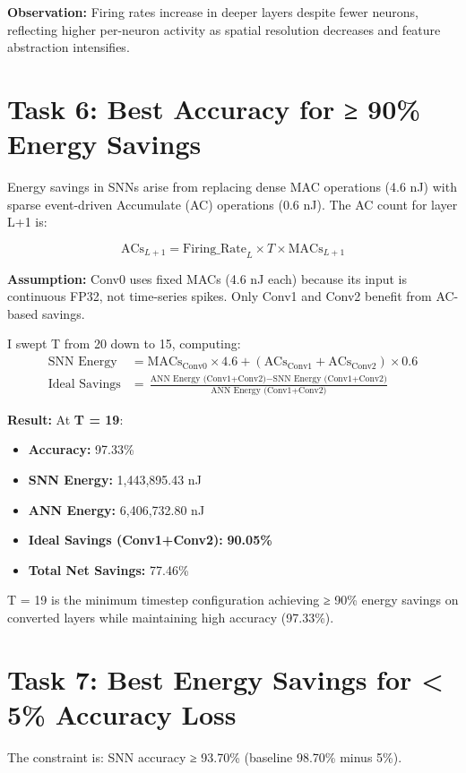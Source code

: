 \documentclass[11pt, a4paper]{article}
\begin{document}
\textbf{Observation:} Firing rates increase in deeper layers despite fewer neurons, reflecting higher per-neuron activity as spatial resolution decreases and feature abstraction intensifies.

\section{Task 6: Best Accuracy for ≥ 90\% Energy Savings}

Energy savings in SNNs arise from replacing dense MAC operations (4.6 nJ) with sparse event-driven Accumulate (AC) operations (0.6 nJ). The AC count for layer L+1 is:

\[
\text{ACs}_{L+1} = \text{Firing\_Rate}_L \times T \times \text{MACs}_{L+1}
\]

\textbf{Assumption:} Conv0 uses fixed MACs (4.6 nJ each) because its input is continuous FP32, not time-series spikes. Only Conv1 and Conv2 benefit from AC-based savings.

I swept T from 20 down to 15, computing:
\begin{align*}
\text{SNN Energy} &= \text{MACs}_{\text{Conv0}} \times 4.6 + (\text{ACs}_{\text{Conv1}} + \text{ACs}_{\text{Conv2}}) \times 0.6 \\
\text{Ideal Savings} &= \frac{\text{ANN Energy (Conv1+Conv2)} - \text{SNN Energy (Conv1+Conv2)}}{\text{ANN Energy (Conv1+Conv2)}}
\end{align*}

\textbf{Result:} At \textbf{T = 19}:
\begin{itemize}
    \item \textbf{Accuracy:} 97.33\%
    \item \textbf{SNN Energy:} 1,443,895.43 nJ
    \item \textbf{ANN Energy:} 6,406,732.80 nJ
    \item \textbf{Ideal Savings (Conv1+Conv2):} \textbf{90.05\%}
    \item \textbf{Total Net Savings:} 77.46\%
\end{itemize}

T = 19 is the minimum timestep configuration achieving ≥ 90\% energy savings on converted layers while maintaining high accuracy (97.33\%).

\section{Task 7: Best Energy Savings for < 5\% Accuracy Loss}

The constraint is: SNN accuracy ≥ 93.70\% (baseline 98.70\% minus 5\%).
\end{document}
